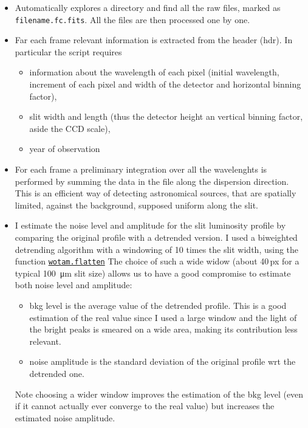 \documentclass{article}
\begin{document}
\begin{itemize}
	\item Automatically explores a directory and find all the raw files, marked as \texttt{filename.fc.fits}. All the files are then processed one by one.
	
	\item Far each frame relevant information is extracted from the header (hdr). In particular the script requires
	\begin{itemize}
		\item information about the wavelength of each pixel (initial wavelength, increment of each pixel and width of the detector and horizontal binning factor),
		\item slit width and length (thus the detector height an vertical binning factor, aside the CCD scale),
		\item year of observation
	\end{itemize}
	\item For each frame a preliminary integration over all the wavelenghts is performed by summing the data in the file along the dispersion direction. This is an efficient way of detecting astronomical sources, that are spatially limited, against the background, supposed uniform along the slit.
	
	\item I estimate the noise level and amplitude for the slit luminosity profile by comparing the original profile with a detrended version.
	I used a biweighted detrending algorithm with a windowing of 10 times the slit width, using the function \href{https://github.com/hippke/wotan}{\texttt{wotam.flatten}}
	The choice of such a wide widow (about 40\,px for a typical \SI{100}{\micro\metre} slit size) allows us to have a good compromise to estimate both noise level and amplitude:
	\begin{itemize}
		\item bkg level is the average value of the detrended profile. This is a good estimation of the real value since I used a large window and the light of the bright peaks is smeared on a wide area, making its contribution less relevant.
		\item noise amplitude is the standard deviation of the original profile wrt the detrended one.
	\end{itemize}
	Note choosing a wider window improves the estimation of the bkg level (even if it cannot actually ever converge to the real value) but increases the estimated noise amplitude.
	

\end{itemize}
\end{document}
